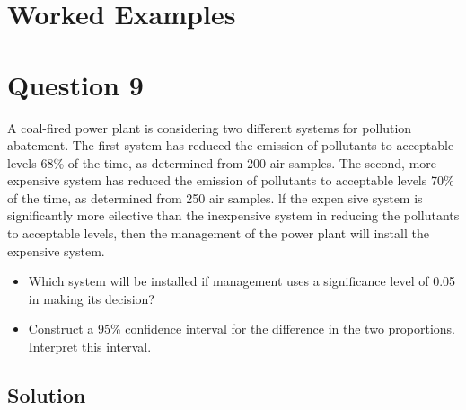\documentclass[a4paper,12pt]{article}
\begin{document}
\section{Worked Examples}

\section*{Question 9}
A coal-fired power plant is considering two different systems for pollution abatement.
The first system has reduced the emission of pollutants to acceptable levels 68\% of the time,
as determined from 200 air samples. The second, more expensive system has reduced the
emission of
pollutants to acceptable levels 70\% of the time, as determined from 250 air samples. lf the
expen sive system is significantly more eilective than the inexpensive system in reducing the
pollutants to acceptable levels, then the management of the power plant will install the
expensive system.

\begin{itemize}
\item  Which system will be installed if management uses a significance level of 0.05 in making
its decision?
\item  Construct a 95\% confidence interval for the difference in the two proportions. Interpret
this interval.
\end{itemize}
\subsection*{Solution}
\end{document}
